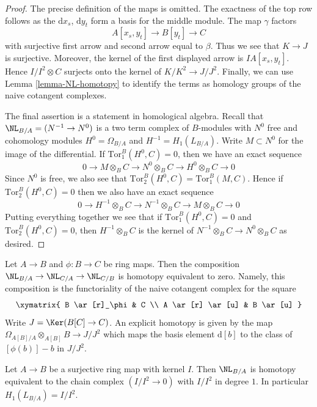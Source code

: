 \begin{proof}
The precise definition of the maps is omitted.
The exactness of the top row follows as the $\text{d}x_s$,
$\text{d}y_t$ form a basis for the middle module.
The map $\gamma$ factors
$$
A[x_s, y_t] \to B[y_t] \to C
$$
with surjective first arrow and second arrow equal to $\beta$.
Thus we see that $K \to J$ is surjective.
Moreover, the kernel of the first displayed arrow is
$IA[x_s, y_t]$. Hence $I/I^2 \otimes C$ surjects onto the
kernel of $K/K^2 \to J/J^2$. Finally, we can use
Lemma \ref{lemma-NL-homotopy}
to identify the terms as homology groups of the naive
cotangent complexes.

\medskip\noindent
The final assertion is a statement in homological algebra.
Recall that $\NL_{B/A} = (N^{-1} \to N^0)$ is a two term
complex of $B$-modules with $N^0$ free and cohomology modules
$H^0 = \Omega_{B/A}$ and $H^{-1} = H_1(L_{B/A})$.
Write $M \subset N^0$ for the image of the differential.
If $\text{Tor}_1^B(H^0, C) = 0$, then we have an exact sequence
$$
0 \to M \otimes_B C \to N^0 \otimes_B C \to H^0 \otimes_B C \to 0
$$
Since $N^0$ is free, we also see that $\text{Tor}_2^B(H^0, C) =
\text{Tor}_1^B(M, C)$. Hence if $\text{Tor}_2^B(H^0, C) = 0$
then we also have an exact sequence
$$
0 \to H^{-1} \otimes_B C \to N^{-1} \otimes_B C \to M \otimes_B C \to 0
$$
Putting everything together we see that if
$\text{Tor}_1^B(H^0, C) = 0$ and $\text{Tor}_2^B(H^0, C) = 0$,
then $H^{-1} \otimes_B C$ is the kernel of
$N^{-1} \otimes_B C \to N^0 \otimes_B C$ as desired.
\end{proof}

\begin{remark}
\label{remark-composition-homotopy-equivalent-to-zero}
Let $A \to B$ and $\phi : B \to C$ be ring maps.
Then the composition $\NL_{B/A} \to \NL_{C/A} \to \NL_{C/B}$ is
homotopy equivalent to zero. Namely, this composition is the functoriality
of the naive cotangent complex for the square
$$
\xymatrix{
B \ar[r]_\phi & C \\
A \ar[r] \ar[u] & B \ar[u]
}
$$
Write $J = \Ker(B[C] \to C)$. An explicit homotopy is given by the map
$\Omega_{A[B]/A} \otimes_{A[B]} B \to J/J^2$ which maps the basis element
$\text{d}[b]$ to the class of $[\phi(b)] - b$ in $J/J^2$.
\end{remark}

\begin{lemma}
\label{lemma-NL-surjection}
Let $A \to B$ be a surjective ring map with kernel $I$.
Then $\NL_{B/A}$ is homotopy equivalent to the chain complex
$(I/I^2 \to 0)$ with $I/I^2$ in degree $1$. In particular
$H_1(L_{B/A}) = I/I^2$.
\end{lemma}

